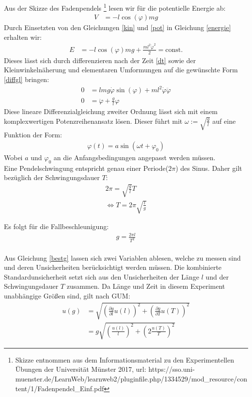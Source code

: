 Aus der Skizze des Fadenpendels \footnote{Skizze entnommen aus dem Informationsmaterial zu den Experimentellen Übungen der Universität Münster 2017, url: https://sso.uni-muenster.de/LearnWeb/learnweb2/pluginfile.php/1334529/mod\_resource/content/1/Fadenpendel\_Einf.pdf }  lesen wir für die potentielle Energie ab:
\begin{align}
V&=-l \cos (\varphi) m g
\label{pot}
\end{align}
Durch Einsetzten von den Gleichungen \cref{kin} und \cref{pot} in Gleichung \cref{energie} erhalten wir:
\begin{align}
E&=-l \cos (\varphi) m g +\frac{ml^2\dot{\varphi}^2}{2}=\textrm{const.}
\end{align}
Dieses lässt sich durch differenzieren nach der Zeit \cref{dt} sowie der Kleinwinkelnäherung und elementaren Umformungen auf die gewünschte Form \cref{diffgl} bringen:
\begin{align}
	0&=lmg \dot{\varphi}\sin (\varphi) +ml^2 \dot{\varphi} \ddot{\varphi}
	\label{dt} \\
	0&=\ddot{\varphi}+\frac{g}{l} \varphi
	\label{diffgl}
\end{align}
Diese lineare Differenzialgleichung zweiter Ordnung lässt sich mit einem komplexwertigen Potenzreihenansatz lösen. Dieser führt mit $\omega:=\sqrt{\frac{g}{l}}$ auf eine Funktion der Form: 
\begin{align}
\varphi(t)=a \sin (\omega t + \varphi_0)
\end{align}
Wobei $a$ und $\varphi_0$ an die Anfangsbedingungen angepasst werden müssen.\\
Eine Pendelschwingung entspricht genau einer Periode($2\pi$) des Sinus. Daher gilt bezüglich der Schwingungsdauer $T$:
\begin{align}
	2\pi = \sqrt{\frac{g}{l}} T \\
	\Leftrightarrow T= 2 \pi \sqrt{\frac{l}{g}}
\end{align}

Es folgt für die Fallbeschleunigung:
\begin{align}
g=\frac{2 \pi l}{T^2}
\label{bestg}
\end{align}\\



Aus Gleichung \ref{bestg} lassen sich zwei Variablen ablesen, welche zu messen sind und deren Unsicherheiten berücksichtigt werden müssen. Die kombinierte Standardunsicherheit setzt sich aus den Unsicherheiten der Länge $l$ und der Schwingungsdauer $T$ zusammen. Da Länge und Zeit in diesem Experiment unabhängige Größen sind, gilt nach GUM:
\begin{align}
u(g)&=\sqrt{\left(\frac{\partial g}{\partial l} u(l)\right)^2 + \left(\frac{\partial g}{\partial T}u(T)\right)^2 } \\
   &= g \sqrt{\left(\frac{u(l)}{l}\right)^2+ \left(2 \frac{ u(T)}{T}\right)^2 }
   \label{kombu}
\end{align}  





